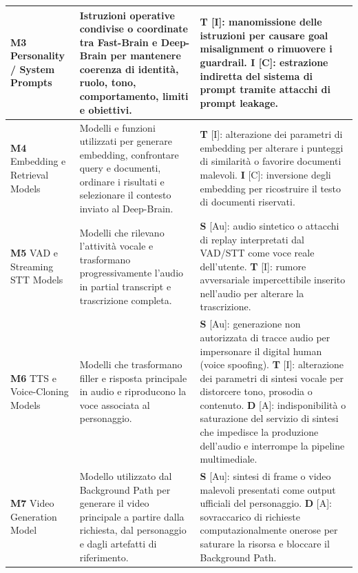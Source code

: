 \documentclass[11pt,a4paper]{article}
\begin{document}
\begin{longtable}{|C{2.8cm}|L{4.2cm}|L{\dimexpr\textwidth-2.8cm-4.2cm-6\arrayrulewidth\relax}|}
\textbf{M3} \newline Personality / System Prompts & 
Istruzioni operative condivise o coordinate tra Fast-Brain e Deep-Brain per mantenere coerenza di identità, ruolo, tono, comportamento, limiti e obiettivi. & 
\textbf{T} [I]: manomissione delle istruzioni per causare goal misalignment o rimuovere i guardrail. \newline \textbf{I} [C]: estrazione indiretta del sistema di prompt tramite attacchi di prompt leakage. \\
\hline

\textbf{M4} \newline Embedding e Retrieval Models & 
Modelli e funzioni utilizzati per generare embedding, confrontare query e documenti, ordinare i risultati e selezionare il contesto inviato al Deep-Brain. & 
\textbf{T} [I]: alterazione dei parametri di embedding per alterare i punteggi di similarità o favorire documenti malevoli. \newline \textbf{I} [C]: inversione degli embedding per ricostruire il testo di documenti riservati. \\
\hline

\textbf{M5} \newline VAD e Streaming STT Models & 
Modelli che rilevano l'attività vocale e trasformano progressivamente l'audio in partial transcript e trascrizione completa. & 
\textbf{S} [Au]: audio sintetico o attacchi di replay interpretati dal VAD/STT come voce reale dell'utente. \newline \textbf{T} [I]: rumore avversariale impercettibile inserito nell'audio per alterare la trascrizione. \\
\hline

\textbf{M6} \newline TTS e Voice-Cloning Models & 
Modelli che trasformano filler e risposta principale in audio e riproducono la voce associata al personaggio. & 
\textbf{S} [Au]: generazione non autorizzata di tracce audio per impersonare il digital human (voice spoofing). \newline \textbf{T} [I]: alterazione dei parametri di sintesi vocale per distorcere tono, prosodia o contenuto. \newline \textbf{D} [A]: indisponibilità o saturazione del servizio di sintesi che impedisce la produzione dell'audio e interrompe la pipeline multimediale. \\
\hline

\textbf{M7} \newline Video Generation Model & 
Modello utilizzato dal Background Path per generare il video principale a partire dalla richiesta, dal personaggio e dagli artefatti di riferimento. & 
\textbf{S} [Au]: sintesi di frame o video malevoli presentati come output ufficiali del personaggio. \newline \textbf{D} [A]: sovraccarico di richieste computazionalmente onerose per saturare la risorsa e bloccare il Background Path. \\
\hline


\end{longtable}
\end{document}
